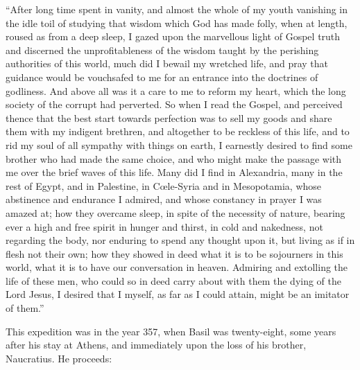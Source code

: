 ``After long time spent in vanity, and almost the whole of my
youth vanishing in the idle toil of studying that wisdom which God has
made folly, when at length, roused as from a deep sleep, I gazed upon
the marvellous light of Gospel truth and discerned the
unprofitableness of the wisdom taught by the perishing authorities of
this world, much did I bewail my wretched life, and pray that guidance
would be vouchsafed to me for an entrance into the doctrines of
godliness. And above all was it a care to me to reform my heart, which
the long society of the corrupt had perverted. So when I read the
Gospel, and perceived thence that the best start towards perfection
was to sell my goods and share them with my indigent brethren, and
altogether to be reckless of this life, and to rid my soul of all
sympathy with things on earth, I earnestly desired to find some
brother who had made the same choice, and who might make the passage
with me over the brief waves of this life. Many did I find in
Alexandria, many in the rest of Egypt, and in Palestine, in Cœle-Syria
and in Mesopotamia, whose abstinence and endurance I admired, and
whose constancy in prayer I was amazed at; how they overcame sleep, in
spite of the necessity of nature, bearing ever a high and free spirit
in hunger and thirst, in cold and nakedness, not regarding the body,
nor enduring to spend any thought upon it, but living as if in flesh
not their own; how they showed in deed what it is to be sojourners in
this world, what it is to have our conversation in heaven. Admiring
and extolling the life of these men, who could so in deed carry
about with them the dying of the Lord Jesus, I desired that I myself,
as far as I could attain, might be an imitator of them.''

This expedition was in the year 357, when Basil was twenty-eight, some years after his stay at Athens, and immediately
upon the loss of his brother, Naucratius. He proceeds:

